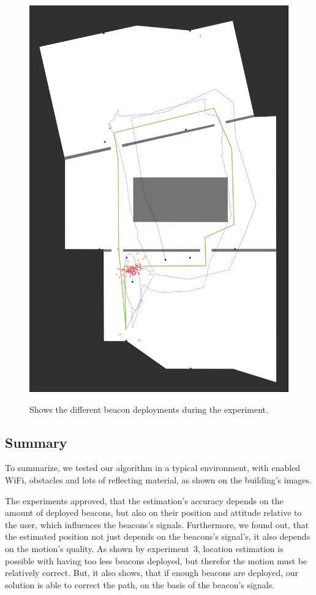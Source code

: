 \begin{figure}
{		\includegraphics[height=0.45\textheight]{figures/eval_3_6}
		\label{fig:exp2_imgs_6}
	}
	\caption{Shows the different beacon deployments during the experiment.}
\end{figure}


\subsection*{Summary}
To summarize, we tested our algorithm in a typical environment, with enabled WiFi, obstacles and lots of reflecting material, as shown on the building's images.

The experiments approved, that the estimation's accuracy depends on the amount of deployed beacons, but also on their position and attitude relative to the user, which influences the beacons's signals. Furthermore, we found out, that the estimated position not just depends on the beacons's signal's, it also depends on the motion's quality. As shown by experiment~3, location estimation is possible with having too less beacons deployed, but therefor the motion must be relatively correct. But, it also shows, that if enough beacons are deployed, our solution is able to correct the path, on the basis of the beacon's signals.

